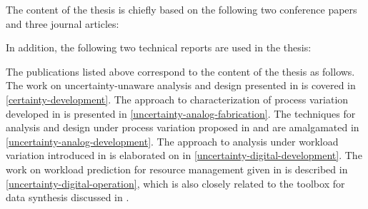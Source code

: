 The content of the thesis is chiefly based on the following two conference
papers and three journal articles:

\printbibliography[heading=none,keyword=own]

In addition, the following two technical reports are used in the thesis:

\printbibliography[heading=none,keyword=own-unpublished]

The publications listed above correspond to the content of the thesis as
follows. The work on uncertainty-unaware analysis and design presented in
\cite{ukhov2012} is covered in \cref{certainty-development}. The approach to
characterization of process variation developed in \cite{ukhov2014a} is
presented in \cref{uncertainty-analog-fabrication}. The techniques for analysis
and design under process variation proposed in \cite{ukhov2014b} and
\cite{ukhov2015} are amalgamated in \cref{uncertainty-analog-development}. The
approach to analysis under workload variation introduced in \cite{ukhov2017a} is
elaborated on in \cref{uncertainty-digital-development}. The work on workload
prediction for resource management given in \cite{ukhov2017b} is described in
\cref{uncertainty-digital-operation}, which is also closely related to the
toolbox for data synthesis discussed in \cite{ukhov2017c}.
